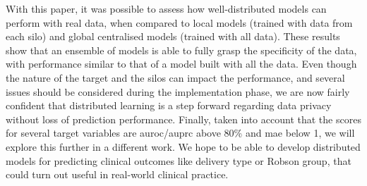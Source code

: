 With this paper, it was possible to assess how well-distributed models can perform with real data, when compared to local models (trained with data from each silo) and global centralised models (trained with all data). These results show that an ensemble of models is able to fully grasp the specificity of the data, with performance similar to that of a model built with all the data. Even though the nature of the target and the silos can impact the performance, and several issues should be considered during the implementation phase, we are now fairly confident that distributed learning is a step forward regarding data privacy without loss of prediction performance.
Finally, taken into account that the scores for several target variables are \ac{auroc}/\ac{auprc} above 80\% and \ac{mae} below 1, we will explore this further in a different work. We hope to be able to develop distributed models for predicting clinical outcomes like delivery type or Robson group, that could turn out useful in real-world clinical practice.

